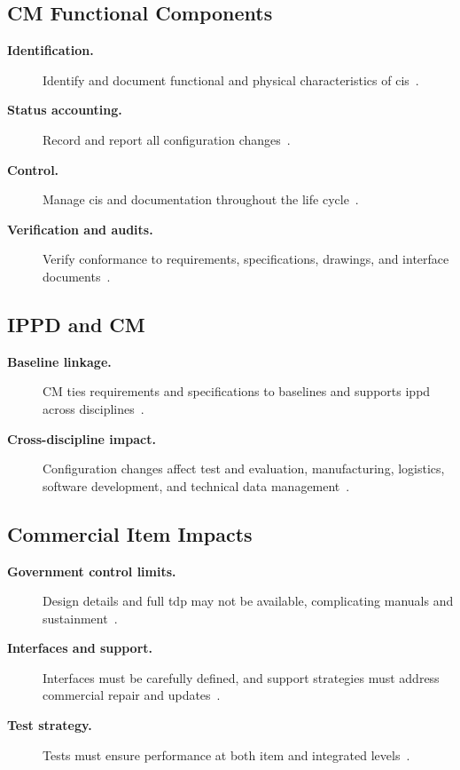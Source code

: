 \documentclass[../main.tex]{subfiles}
\begin{document}
\subsection{CM Functional Components}
\begin{description}
  \item[\textbf{Identification.}] Identify and document functional and physical characteristics of \acp{ci}~\autocite{edo-3-5-3-cm-tech-reviews-2025}.
  \item[\textbf{Status accounting.}] Record and report all configuration changes~\autocite{edo-3-5-3-cm-tech-reviews-2025}.
  \item[\textbf{Control.}] Manage \acp{ci} and documentation throughout the life cycle~\autocite{edo-3-5-3-cm-tech-reviews-2025}.
  \item[\textbf{Verification and audits.}] Verify conformance to requirements, specifications, drawings, and interface documents~\autocite{edo-3-5-3-cm-tech-reviews-2025}.
\end{description}

\subsection{IPPD and CM}
\begin{description}
  \item[\textbf{Baseline linkage.}] CM ties requirements and specifications to baselines and supports \ac{ippd} across disciplines~\autocite{edo-3-5-3-cm-tech-reviews-2025}.
  \item[\textbf{Cross-discipline impact.}] Configuration changes affect test and evaluation, manufacturing, logistics, software development, and technical data management~\autocite{edo-3-5-3-cm-tech-reviews-2025}.
\end{description}

\subsection{Commercial Item Impacts}
\begin{description}
  \item[\textbf{Government control limits.}] Design details and full \ac{tdp} may not be available, complicating manuals and sustainment~\autocite{edo-3-5-3-cm-tech-reviews-2025}.
  \item[\textbf{Interfaces and support.}] Interfaces must be carefully defined, and support strategies must address commercial repair and updates~\autocite{edo-3-5-3-cm-tech-reviews-2025}.
  \item[\textbf{Test strategy.}] Tests must ensure performance at both item and integrated levels~\autocite{edo-3-5-3-cm-tech-reviews-2025}.
\end{description}
\end{document}
